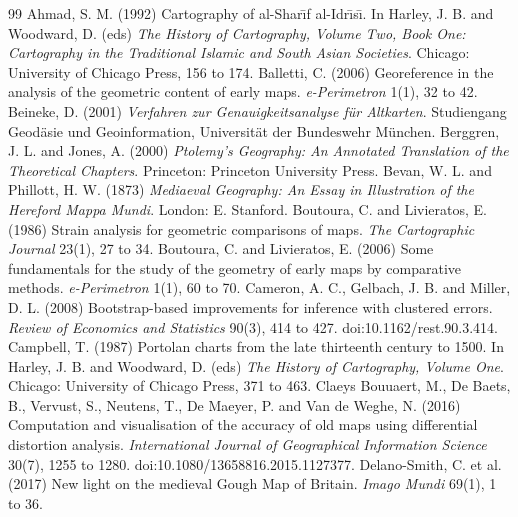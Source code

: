 \documentclass[11pt,a4paper]{article}
\begin{document}
\begin{thebibliography}{99}
 Ahmad, S. M. (1992) Cartography of al-Shar\={\i}f al-Idr\={\i}s\={\i}. In Harley, J. B. and Woodward, D. (eds) \textit{The History of Cartography, Volume Two, Book One: Cartography in the Traditional Islamic and South Asian Societies}. Chicago: University of Chicago Press, 156 to 174.
 Balletti, C. (2006) Georeference in the analysis of the geometric content of early maps. \textit{e-Perimetron} 1(1), 32 to 42.
 Beineke, D. (2001) \textit{Verfahren zur Genauigkeitsanalyse f\"ur Altkarten}. Studiengang Geod\"asie und Geoinformation, Universit\"at der Bundeswehr M\"unchen.
 Berggren, J. L. and Jones, A. (2000) \textit{Ptolemy's Geography: An Annotated Translation of the Theoretical Chapters}. Princeton: Princeton University Press.
 Bevan, W. L. and Phillott, H. W. (1873) \textit{Mediaeval Geography: An Essay in Illustration of the Hereford Mappa Mundi}. London: E. Stanford.
 Boutoura, C. and Livieratos, E. (1986) Strain analysis for geometric comparisons of maps. \textit{The Cartographic Journal} 23(1), 27 to 34.
 Boutoura, C. and Livieratos, E. (2006) Some fundamentals for the study of the geometry of early maps by comparative methods. \textit{e-Perimetron} 1(1), 60 to 70.
 Cameron, A. C., Gelbach, J. B. and Miller, D. L. (2008) Bootstrap-based improvements for inference with clustered errors. \textit{Review of Economics and Statistics} 90(3), 414 to 427. doi:10.1162/rest.90.3.414.
 Campbell, T. (1987) Portolan charts from the late thirteenth century to 1500. In Harley, J. B. and Woodward, D. (eds) \textit{The History of Cartography, Volume One}. Chicago: University of Chicago Press, 371 to 463.
 Claeys Bouuaert, M., De Baets, B., Vervust, S., Neutens, T., De Maeyer, P. and Van de Weghe, N. (2016) Computation and visualisation of the accuracy of old maps using differential distortion analysis. \textit{International Journal of Geographical Information Science} 30(7), 1255 to 1280. doi:10.1080/13658816.2015.1127377.
 Delano-Smith, C. et al. (2017) New light on the medieval Gough Map of Britain. \textit{Imago Mundi} 69(1), 1 to 36.

\end{thebibliography}
\end{document}

